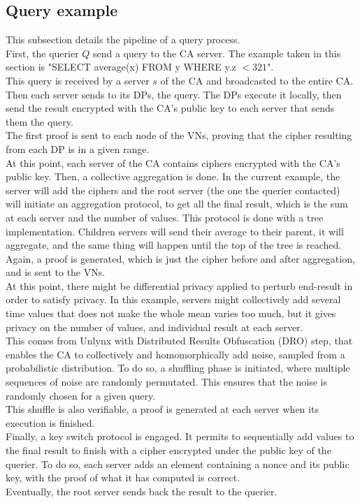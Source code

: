 \documentclass{article}
\begin{document}
\subsection{Query example}
This subsection details the pipeline of a query process.\\
First, the querier $Q$ send a query to the CA server. The example taken in this section is "SELECT average(x) FROM y WHERE y.z $< 321$".\\
This query is received by a server $s$ of the CA and broadcasted to the entire CA. Then each server sends to its DPs, the query. The DPs execute it locally, then send the result encrypted with the CA's public key to each server that sends them the query.\\
The first proof is sent to each node of the VNs, proving that the cipher resulting from each DP is in a given range.\\
At this point, each server of the CA contains ciphers encrypted with the CA's public key.
Then, a collective aggregation is done. In the current example, the server will add the ciphers and the root server (the one the querier contacted) will initiate an aggregation protocol, to get all the final result, which is the sum at each server and the number of values. This protocol is done with a tree implementation. Children servers will send their average to their parent, it will aggregate, and the same thing will happen until the top of the tree is reached.\\
Again, a proof is generated, which is just the cipher before and after aggregation, and is sent to the VNs.\\
At this point, there might be differential privacy applied to perturb end-result in order to satisfy privacy. In this example, servers might collectively add several time values that does not make the whole mean varies too much, but it gives privacy on the number of values, and individual result at each server.\\
This comes from Unlynx with Distributed Results Obfuscation (DRO) step, that enables the CA to collectively and homomorphically add noise, sampled from a probabilistic distribution.
To do so, a shuffling phase is initiated, where multiple sequences of noise are randomly permutated. This ensures that the noise is randomly chosen for a given query.\\
This shuffle is also verifiable, a proof is generated at each server when its execution is finished.\\
Finally, a key switch protocol is engaged. It permits to sequentially add values to the final result to finish with a cipher encrypted under the public key of the querier. To do so, each server adds an element containing a nonce and its public key, with the proof of what it has computed is correct.\\
Eventually, the root server sends back the result to the querier.\\
\end{document}
